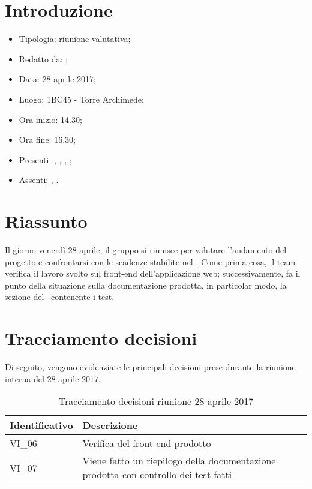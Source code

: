 \section{Introduzione}

	\begin{itemize}
		\item Tipologia: riunione valutativa;
		\item Redatto da: \DS;
		\item Data: 28 aprile 2017;
		\item Luogo: 1BC45 - Torre Archimede;
		\item Ora inizio: 14.30;
		\item Ora fine: 16.30;
		\item Presenti: \AN, \DS, \AS, \NS;	
		\item Assenti: \MC, \DAN.
	\end{itemize}

\section{Riassunto}
Il giorno venerdì 28 aprile, il gruppo si riunisce per valutare l'andamento del progetto e confrontarsi con le scadenze stabilite nel \PdP.
Come prima cosa, il team verifica il lavoro svolto sul front-end dell'applicazione web; successivamente, fa il punto della situazione sulla documentazione prodotta, in particolar modo, la sezione del \PdQ\ contenente i test.

\section{Tracciamento decisioni}
Di seguito, vengono evidenziate le principali decisioni prese durante la riunione interna del 28 aprile 2017.

\begin{table}[H]
	\begin{center}
		\begin{tabular}{|p{3cm}| p{11cm}|}
			\hline
			\textbf{Identificativo}	& \textbf{Descrizione} \\
			\hline
			VI\_06	&  Verifica del front-end prodotto \\
			\hline
			VI\_07 &  Viene fatto un riepilogo della documentazione prodotta con controllo dei test fatti \\
			\hline
		\end{tabular}
		\caption{Tracciamento decisioni riunione 28 aprile 2017}
	\end{center}
\end{table}